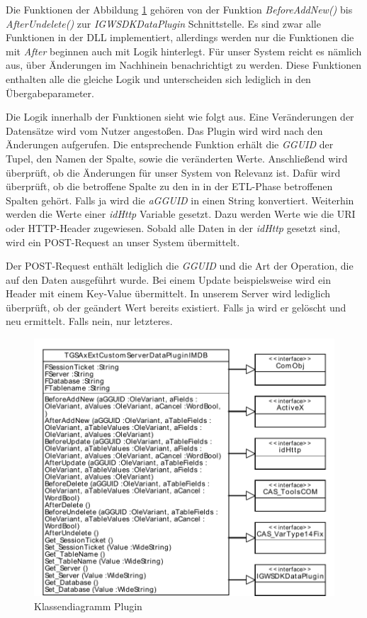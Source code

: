 Die Funktionen der Abbildung \ref{ergebniss_plugin_klassendiagramm} gehören von der Funktion \textit{BeforeAddNew()} bis \textit{AfterUndelete()} zur \textit{IGWSDKDataPlugin} Schnittstelle. Es sind zwar alle Funktionen in der DLL implementiert, allerdings werden nur die Funktionen die mit \textit{After} beginnen auch mit Logik hinterlegt. Für unser System reicht es nämlich aus, über Änderungen im Nachhinein benachrichtigt zu werden. Diese Funktionen enthalten alle die gleiche Logik und unterscheiden sich lediglich in den Übergabeparameter.

Die Logik innerhalb der Funktionen sieht wie folgt aus. Eine Veränderungen der Datensätze wird vom Nutzer angestoßen. Das Plugin wird wird nach den Änderungen aufgerufen. Die entsprechende Funktion erhält die \textit{GGUID} der Tupel, den Namen der Spalte, sowie die veränderten Werte. Anschließend wird überprüft, ob die Änderungen für unser System von Relevanz ist. Dafür wird überprüft, ob die betroffene Spalte zu den in in der ETL-Phase betroffenen Spalten gehört. Falls ja wird die \textit{aGGUID} in einen String konvertiert. Weiterhin werden die Werte einer \textit{idHttp} Variable gesetzt. Dazu werden Werte wie die URI oder HTTP-Header zugewiesen. Sobald alle Daten in der \textit{idHttp} gesetzt sind, wird ein POST-Request an unser System übermittelt. 

Der POST-Request enthält lediglich die \textit{GGUID} und die Art der Operation, die auf den Daten ausgeführt wurde. Bei einem Update beispielsweise wird ein Header mit einem Key-Value übermittelt. In unserem Server wird lediglich überprüft, ob der geändert Wert bereits existiert. Falls ja wird er gelöscht und neu ermittelt. Falls nein, nur letzteres.


\begin{figure}[htbp]
\centering
\includegraphics[scale=0.8]{pics/plugin_klassendiagramm.pdf}
\caption{Klassendiagramm Plugin}
\label{ergebniss_plugin_klassendiagramm}
\end{figure}

